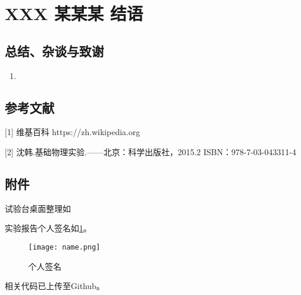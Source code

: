 \documentclass[dvipsnames, svgnames,a4paper,11pt]{article}
\begin{document}
	\begin{question}
		
	\end{question}
	
	\begin{question}
		
	\end{question}
	
	
	
	\clearpage
	
	\section{XXX 某某某 \quad\heiti 结语}
	
	\subsection{总结、杂谈与致谢}
	\begin{enumerate}
		\item 
	\end{enumerate}
	
	\subsection{参考文献}
	[1] 维基百科 https://zh.wikipedia.org
	
	[2] 沈韩.基础物理实验.——北京：科学出版社，2015.2 ISBN：978-7-03-043311-4
	
	
	\subsection{附件}
	试验台桌面整理如%
	
	实验报告个人签名如\cref{fig:name}。
	
	\begin{figure}[htbp]
		\centering
		\texttt{[image: name.png]}
		\caption{个人签名}
		\label{fig:name}
	\end{figure}
	
	
	相关代码已上传至Github。
	
	
	
\end{document}
